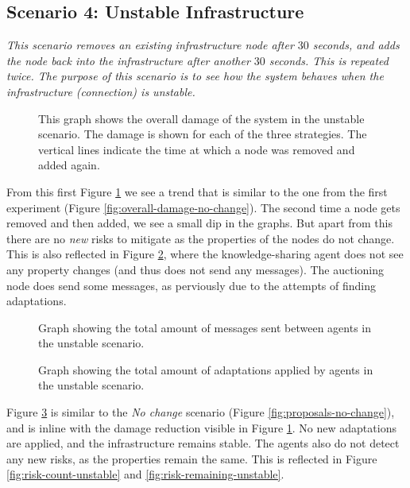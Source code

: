\subsection{Scenario 4: Unstable Infrastructure}
\textit{This scenario removes an existing infrastructure node after $30$ seconds, and adds the node back into the infrastructure after another $30$ seconds. This is repeated twice. The purpose of this scenario is to see how the system behaves when the infrastructure (connection) is unstable.}

\begin{figure}[H]
    \centering
    
    \caption{This graph shows the overall damage of the system in the unstable scenario. The damage is shown for each of the three strategies. The vertical lines indicate the time at which a node was removed and added again.}
    \label{fig:overall-damage-unstable}
\end{figure}

From this first Figure \ref{fig:overall-damage-unstable} we see a trend that is similar to the one from the first experiment (Figure \ref{fig:overall-damage-no-change}). The second time a node gets removed and then added, we see a small dip in the graphs. But apart from this there are no \emph{new} risks to mitigate as the properties of the nodes do not change. This is also reflected in Figure \ref{fig:messages-unstable}, where the knowledge-sharing agent does not see any property changes (and thus does not send any messages). The auctioning node does send some messages, as perviously due to the attempts of finding adaptations.

\begin{figure}[H]
    \centering
    
    \caption{Graph showing the total amount of messages sent between agents in the unstable scenario.}
    \label{fig:messages-unstable}
\end{figure}

\begin{figure}[H]
    \centering
    
    \caption{Graph showing the total amount of adaptations applied by agents in the unstable scenario.}
    \label{fig:proposals-unstable}
\end{figure}

Figure \ref{fig:proposals-unstable} is similar to the \emph{No change} scenario (Figure \ref{fig:proposals-no-change}), and is inline with the damage reduction visible in Figure \ref{fig:overall-damage-unstable}. No new adaptations are applied, and the infrastructure remains stable. The agents also do not detect any new risks, as the properties remain the same. This is reflected in Figure \ref{fig:risk-count-unstable} and \ref{fig:risk-remaining-unstable}.

